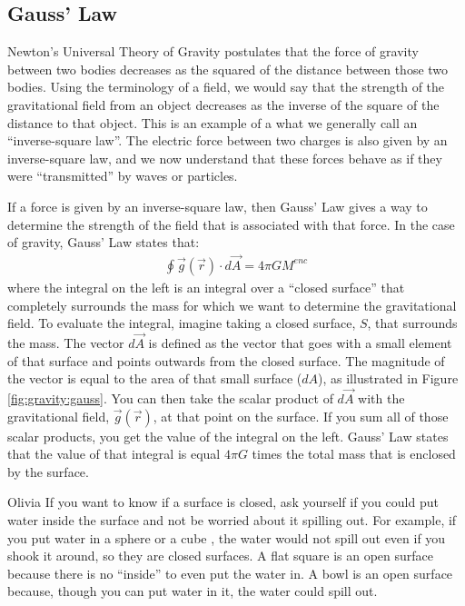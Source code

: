 \subsection{Gauss' Law}
\label{sec:gravity:gauss}
Newton's Universal Theory of Gravity postulates that the force of gravity between two bodies decreases as the squared of the distance between those two bodies. Using the terminology of a field, we would say that the strength of the gravitational field from an object decreases as the inverse of the square of the distance to that object. This is an example of a what we generally call an ``inverse-square law''. The electric force between two charges is also given by an inverse-square law, and we now understand that these forces behave as if they were ``transmitted'' by waves or particles.

If a force is given by an inverse-square law, then Gauss' Law gives a way to determine the strength of the field that is associated with that force. In the case of gravity, Gauss' Law states that:
\begin{align*}
\oint \vec g(\vec r) \cdot d\vec A = 4\pi G M^{enc}
\end{align*}
where the integral on the left is an integral over a ``closed surface'' that completely surrounds the mass for which we want to determine the gravitational field. To evaluate the integral, imagine taking a closed surface, $S$, that surrounds the mass. The vector $d\vec A$ is defined as the vector that goes with a small element of that surface and points outwards from the closed surface. The magnitude of the vector is equal to the area of that small surface ($dA$), as illustrated in Figure \ref{fig:gravity:gauss}. You can then take the scalar product of $d\vec A$ with the gravitational field, $\vec g(\vec r)$, at that point on the surface. If you sum all of those scalar products, you get the value of the integral on the left. Gauss' Law states that the value of that integral is equal $4 \pi G$ times the total mass that is enclosed by the surface. 
\newpage
\begin{studentOpinion}{Olivia}
If you want to know if a surface is closed, ask yourself if you could put water inside the surface and not be worried about it spilling out. For example, if you put water in a sphere or a cube , the water would not spill out even if you shook it around, so they are closed surfaces. A flat square is an open surface because there is no ``inside'' to even put the water in.  A bowl is an open surface because, though you can put water in it, the water could spill out. 
\end{studentOpinion}
